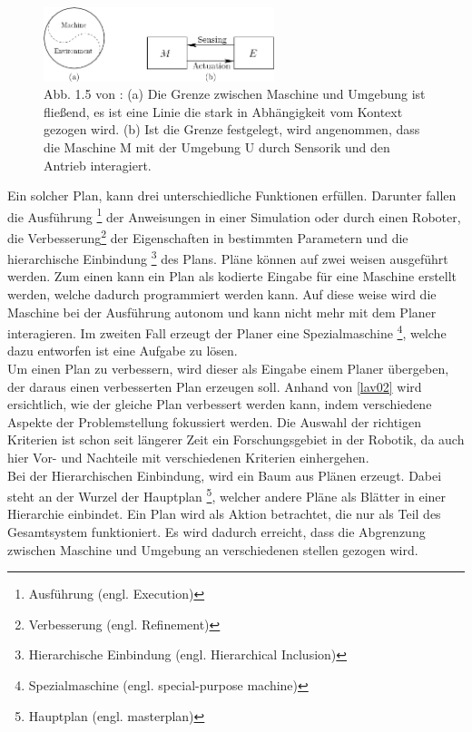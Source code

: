 \begin{figure} %
	\centering
	\includegraphics[width=0.6\textwidth]{images/img224.png}
	\caption{Abb. 1.5 von \cite[~S. 20]{Lav06}:  (a) Die Grenze zwischen Maschine und Umgebung ist fließend, es ist eine Linie die stark in Abhängigkeit vom Kontext gezogen wird. (b) Ist die Grenze festgelegt, wird angenommen, dass die Maschine M mit der Umgebung U durch Sensorik und den Antrieb interagiert.}
	\label{lav01}
\end{figure}
 



Ein solcher Plan, kann drei unterschiedliche Funktionen erfüllen. Darunter fallen die Ausführung \footnote{Ausführung (engl. Execution)} der Anweisungen in einer Simulation oder durch einen Roboter, die Verbesserung\footnote{Verbesserung (engl. Refinement)} der Eigenschaften in bestimmten Parametern und die hierarchische Einbindung \footnote{Hierarchische Einbindung (engl. Hierarchical Inclusion)} des Plans.
Pläne können auf zwei weisen ausgeführt werden. Zum einen kann ein Plan als kodierte Eingabe für eine Maschine erstellt werden, welche dadurch programmiert werden kann. Auf diese weise wird die Maschine bei der Ausführung autonom und kann nicht mehr mit dem Planer interagieren. 
Im zweiten Fall erzeugt der Planer eine Spezialmaschine \footnote{Spezialmaschine (engl. special-purpose machine)}, welche dazu entworfen ist eine Aufgabe zu lösen.
\newline\\
Um einen Plan zu verbessern, wird dieser als Eingabe einem Planer übergeben, der daraus einen verbesserten Plan erzeugen soll. 
Anhand von \ref{lav02} wird ersichtlich, wie der gleiche Plan verbessert werden kann, indem verschiedene Aspekte der Problemstellung fokussiert werden.
Die Auswahl der richtigen Kriterien ist schon seit längerer Zeit ein Forschungsgebiet in der Robotik, da auch hier Vor- und Nachteile mit verschiedenen Kriterien einhergehen. %
\newline\\
Bei der Hierarchischen Einbindung, wird ein Baum aus Plänen erzeugt. Dabei steht an der Wurzel der Hauptplan \footnote{Hauptplan (engl. masterplan)}, welcher andere Pläne als Blätter in einer Hierarchie einbindet. Ein Plan wird als Aktion betrachtet, die nur als Teil des Gesamtsystem funktioniert. Es wird dadurch erreicht, dass die Abgrenzung zwischen Maschine und Umgebung an verschiedenen stellen gezogen wird.
\newline\cite[~S. 21ff]{Lav06} 

